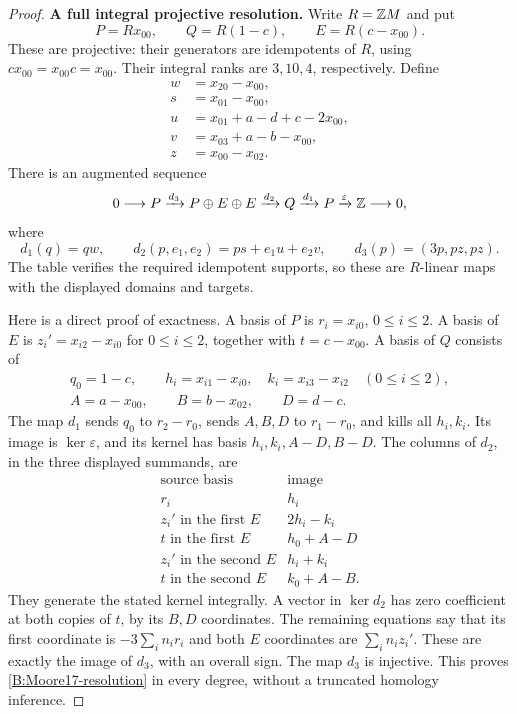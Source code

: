 \begin{proof}
\textbf{A full integral projective resolution.}
Write $R=\mathbb Z M$ and put
\[
 P=Rx_{00},\qquad Q=R(1-c),\qquad E=R(c-x_{00}).
\]
These are projective: their generators are idempotents of $R$,
using $cx_{00}=x_{00}c=x_{00}$. Their integral ranks are
$3,10,4$, respectively. Define
\[
\begin{split}
 w&=x_{20}-x_{00},\\
 s&=x_{01}-x_{00},\\
 u&=x_{01}+a-d+c-2x_{00},\\
 v&=x_{03}+a-b-x_{00},\\
 z&=x_{00}-x_{02}.
\end{split}
\]
There is an augmented sequence
\begin{equation}\label{B:Moore17-resolution}
0\longrightarrow P\xrightarrow{d_3}P\oplus E\oplus E
 \xrightarrow{d_2}Q\xrightarrow{d_1}P
 \xrightarrow{\varepsilon}\mathbb Z\longrightarrow0,
\end{equation}
where
\[
 d_1(q)=qw,\qquad
 d_2(p,e_1,e_2)=ps+e_1u+e_2v,\qquad
 d_3(p)=(3p,pz,pz).
\]
The table verifies the required idempotent supports, so these are
$R$-linear maps with the displayed domains and targets.

Here is a direct proof of exactness. A basis of $P$ is
$r_i=x_{i0}$, $0\leq i\leq2$. A basis of $E$ is
$z_i'=x_{i2}-x_{i0}$ for $0\leq i\leq2$, together with
$t=c-x_{00}$. A basis of $Q$ consists of
\[
\begin{gathered}
 q_0=1-c,\qquad
 h_i=x_{i1}-x_{i0},\quad k_i=x_{i3}-x_{i2}\quad(0\leq i\leq2),\\
 A=a-x_{00},\qquad B=b-x_{02},\qquad D=d-c.
\end{gathered}
\]
The map $d_1$ sends $q_0$ to $r_2-r_0$, sends $A,B,D$
to $r_1-r_0$, and kills all $h_i,k_i$. Its image is
$\ker\varepsilon$, and its kernel has basis
$h_i,k_i,A-D,B-D$.
The columns of $d_2$, in the three displayed summands, are
\[
\begin{array}{c|c}
\text{source basis}&\text{image}\\\hline
r_i&h_i\\
z_i'\text{ in the first }E&2h_i-k_i\\
t\text{ in the first }E&h_0+A-D\\
z_i'\text{ in the second }E&h_i+k_i\\
t\text{ in the second }E&k_0+A-B.
\end{array}
\]
They generate the stated kernel integrally. A vector in
$\ker d_2$ has zero coefficient at both copies of $t$, by its
$B,D$ coordinates. The remaining equations say that its first
coordinate is $-3\sum_i n_i r_i$ and both $E$ coordinates are
$\sum_i n_i z_i'$. These are exactly the image of $d_3$, with
an overall sign. The map $d_3$ is injective. This proves
\eqref{B:Moore17-resolution} in every degree, without a truncated
homology inference.


\end{proof}
